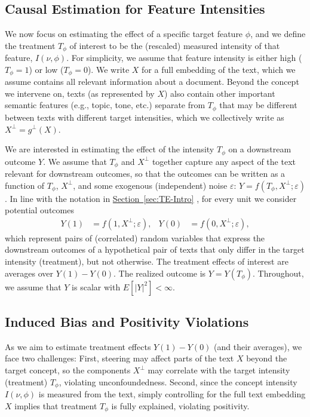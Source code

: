 \documentclass{article}
\theoremstyle{plain}
\theoremstyle{definition}
\theoremstyle{remark}
\newcommand{\myref}[2]{%
    \hyperref[#2]{#1~\ref*{#2}}%
}
\begin{document}
\subsection{Causal Estimation for Feature Intensities}\label{sec:cate_base}

We now focus on estimating the effect of a specific target feature $\phi$, and we define the treatment $T_\phi$ of interest to be the (rescaled) measured intensity of that feature, $I(\nu,\phi)$.
For simplicity, we assume that feature intensity is either high ($T_\phi{=}1$) or low ($T_\phi{=}0$). We write $X$ for a full embedding of the text, which we assume contains all relevant information about a document. Beyond the concept we intervene on, texts (as represented by $X$) also contain other important semantic features (e.g., topic, tone, etc.) separate from $T_\phi$ that may be different between texts with different target intensities, which we collectively write as $X^\perp = g^\perp(X)$.


We are interested in estimating the effect of the intensity $T_\phi$ on a downstream outcome $Y$. We assume that $T_\phi$ and $X^\perp$ together capture any aspect of the text relevant for downstream outcomes, so that the outcomes can be written as a function of $T_\phi$, $X^\perp$, and some exogenous (independent) noise $\varepsilon$: $Y = f(T_\phi,X^\perp; \varepsilon)$.
In line with the notation in \myref{Section}{sec:TE-Intro}, for every unit we consider potential outcomes
\begin{align*}
    Y(1) &= f(1,X^\perp;\varepsilon),
    &
    Y(0) &= f(0,X^\perp;\varepsilon),
\end{align*}
which represent pairs of (correlated) random variables that express the downstream outcomes of a hypothetical pair of texts that only differ in the target intensity (treatment), but not otherwise.
The treatment effects of interest are averages over $Y(1) - Y(0)$.
The realized outcome is $Y = Y(T_\phi)$.
Throughout, we assume that $Y$ is scalar with $E[| Y |^2] < \infty$.

\subsection{Induced Bias and Positivity Violations}

As we aim to estimate treatment effects $Y(1) - Y(0)$ (and their averages), we face two challenges:
First, steering may affect parts of the text $X$ beyond the target concept, so the components $X^\perp$ may correlate with the target intensity (treatment) $T_\phi$, violating unconfoundedness.
Second, since the concept intensity $I(\nu,\phi)$ is measured from the text, simply controlling for the full text embedding $X$ implies that treatment $T_\phi$ is fully explained, violating positivity.
\end{document}
